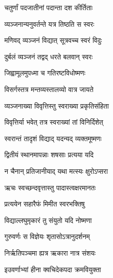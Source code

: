 \resetShloka

{चतुर्णां पदजातीनां पदान्ता दश कीर्तिताः}

{व्यञ्जनान्यनुवर्तन्ते यत्र तिष्ठति स स्वरः}

{मणिवद् व्यञ्जनं विद्यात् सूत्रवच्च स्वरं विदुः}

{दुर्बलं व्यञ्जनं तद्वद् धरते बलवान् स्वरः}

{जिह्वामूलमुपध्मा च गतिरष्टविधोष्मणः}

{विसर्गस्तत्र मन्तव्यस्तालव्यो वात्र जायते}

{व्यञ्जनाख्या विवृत्तिस्तु स्वराख्या प्रकृतिसंहिता}

{विवृत्तिर्या भवेत् तत्र स्वराख्यां तां विनिर्दिशेत्}

{स्वरान्तं तादृशं विद्याद् यदन्यद् व्यक्तमूष्मणः}

{द्वितीयं स्थानमापन्नाः शषसाः प्रत्यया यदि}

{न चैनान् प्रतिजानीयाद् यथा मत्स्यः क्षुरोऽप्सरा}

\closesub

\resetShloka

{ऋचः स्वच्छन्दवृत्तास्तु पादास्त्वक्षरमानतः}

{प्रत्ययेन सहारैफं मिमीत स्वरभक्तिषु}

{विद्याल्लघुमृकारं तु संयुतो यदि नोष्मणा}

{गुरुवर्णः स विज्ञेयः शृतासोऽत्रानुदर्शनम्}

{निर्ऋतिपञ्चमा ह्यत्र ऋकारा नात्र संशयः}

{इउवर्णाभ्यां हीना क्वचिदेकपदा क्रमवियुक्ता}

